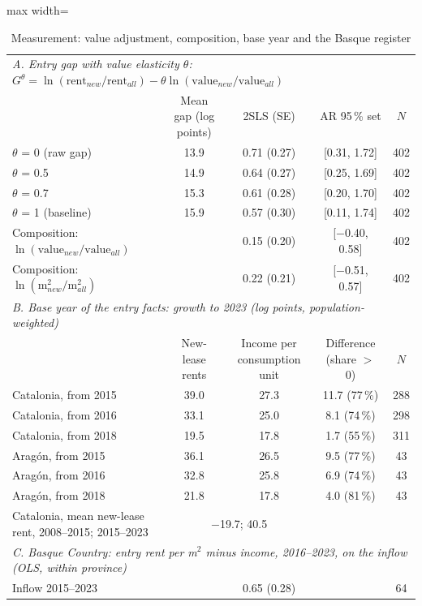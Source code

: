 \begin{table}[!htbp]\centering\small
\caption{Measurement: value adjustment, composition, base year and the Basque register}\label{tab:A2}
\begin{adjustbox}{max width=\linewidth}\begin{tabular}{lcccc}\toprule
\multicolumn{5}{l}{\textit{A. Entry gap with value elasticity $\theta$: $G^\theta=\ln(\text{rent}_{new}/\text{rent}_{all})-\theta\ln(\text{value}_{new}/\text{value}_{all})$}}\\
 & Mean gap (log points) & 2SLS (SE) & AR 95\,\% set & $N$\\
$\theta$ = 0 (raw gap) & 13.9 & 0.71 (0.27) & [0.31, 1.72] & 402\\
$\theta$ = 0.5 & 14.9 & 0.64 (0.27) & [0.25, 1.69] & 402\\
$\theta$ = 0.7 & 15.3 & 0.61 (0.28) & [0.20, 1.70] & 402\\
$\theta$ = 1 (baseline) & 15.9 & 0.57 (0.30) & [0.11, 1.74] & 402\\
Composition: $\ln(\text{value}_{new}/\text{value}_{all})$ & & 0.15 (0.20) & [$-$0.40, 0.58] & 402\\
Composition: $\ln(\text{m}^2_{new}/\text{m}^2_{all})$ & & 0.22 (0.21) & [$-$0.51, 0.57] & 402\\
\midrule
\multicolumn{5}{l}{\textit{B. Base year of the entry facts: growth to 2023 (log points, population-weighted)}}\\
 & New-lease rents & Income per consumption unit & Difference (share $>$ 0) & $N$\\
Catalonia, from 2015 & 39.0 & 27.3 & 11.7 (77\,\%) & 288\\
Catalonia, from 2016 & 33.1 & 25.0 & 8.1 (74\,\%) & 298\\
Catalonia, from 2018 & 19.5 & 17.8 & 1.7 (55\,\%) & 311\\
Aragón, from 2015 & 36.1 & 26.5 & 9.5 (77\,\%) & 43\\
Aragón, from 2016 & 32.8 & 25.8 & 6.9 (74\,\%) & 43\\
Aragón, from 2018 & 21.8 & 17.8 & 4.0 (81\,\%) & 43\\
Catalonia, mean new-lease rent, 2008--2015; 2015--2023 & \multicolumn{2}{c}{$-$19.7; 40.5} & & \\
\midrule
\multicolumn{5}{l}{\textit{C. Basque Country: entry rent per m$^2$ minus income, 2016--2023, on the inflow (OLS, within province)}}\\
Inflow 2015--2023 & & 0.65 (0.28) & & 64\\

\end{tabular}
\end{adjustbox}
\end{table}
